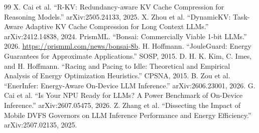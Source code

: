\documentclass[sigconf, anonymous=false, screen=true]{acmart}
\begin{document}
\begin{thebibliography}{99}
 X. Cai et al. ``R-KV: Redundancy-aware KV Cache Compression for Reasoning Models.'' arXiv:2505.24133, 2025.
 X. Zhou et al. ``DynamicKV: Task-Aware Adaptive KV Cache Compression for Long Context LLMs.'' arXiv:2412.14838, 2024.
 PrismML. ``Bonsai: Commercially Viable 1-bit LLMs.'' 2026. \url{https://prismml.com/news/bonsai-8b}.
 H. Hoffmann. ``JouleGuard: Energy Guarantees for Approximate Applications.'' SOSP, 2015.
 D. H. K. Kim, C. Imes, and H. Hoffmann. ``Racing and Pacing to Idle: Theoretical and Empirical Analysis of Energy Optimization Heuristics.'' CPSNA, 2015.
 B. Zou et al. ``EnerInfer: Energy-Aware On-Device LLM Inference.'' arXiv:2606.23001, 2026.
 G. Cai et al. ``Is Your NPU Ready for LLMs? A Power Benchmark of On-Device Inference.'' arXiv:2607.05475, 2026.
 Z. Zhang et al. ``Dissecting the Impact of Mobile DVFS Governors on LLM Inference Performance and Energy Efficiency.'' arXiv:2507.02135, 2025.
\end{thebibliography}
\end{document}
